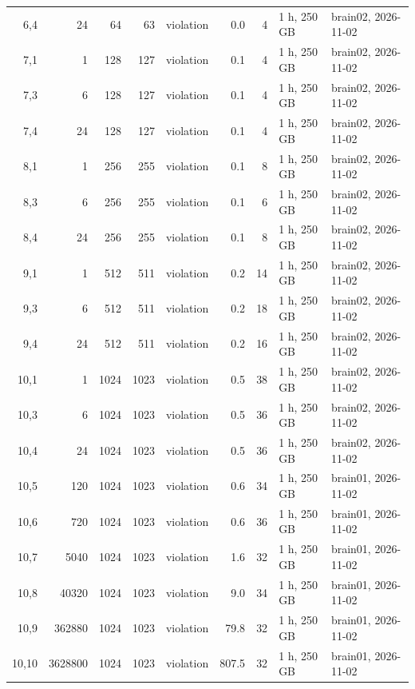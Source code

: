\documentclass[10pt]{article}
\begin{document}
\begin{longtable}{@{}rrrrlrrll@{}}
\color{blue} 6,4 & 24 & 64 & 63 & violation & 0.0 & 4 & 1 h, 250 GB & brain02, 2026-11-02 \\
\color{blue} 7,1 & 1 & 128 & 127 & violation & 0.1 & 4 & 1 h, 250 GB & brain02, 2026-11-02 \\
\color{blue} 7,3 & 6 & 128 & 127 & violation & 0.1 & 4 & 1 h, 250 GB & brain02, 2026-11-02 \\
\color{blue} 7,4 & 24 & 128 & 127 & violation & 0.1 & 4 & 1 h, 250 GB & brain02, 2026-11-02 \\
\color{blue} 8,1 & 1 & 256 & 255 & violation & 0.1 & 8 & 1 h, 250 GB & brain02, 2026-11-02 \\
\color{blue} 8,3 & 6 & 256 & 255 & violation & 0.1 & 6 & 1 h, 250 GB & brain02, 2026-11-02 \\
\color{blue} 8,4 & 24 & 256 & 255 & violation & 0.1 & 8 & 1 h, 250 GB & brain02, 2026-11-02 \\
\color{blue} 9,1 & 1 & 512 & 511 & violation & 0.2 & 14 & 1 h, 250 GB & brain02, 2026-11-02 \\
\color{blue} 9,3 & 6 & 512 & 511 & violation & 0.2 & 18 & 1 h, 250 GB & brain02, 2026-11-02 \\
\color{blue} 9,4 & 24 & 512 & 511 & violation & 0.2 & 16 & 1 h, 250 GB & brain02, 2026-11-02 \\
\color{blue} 10,1 & 1 & 1024 & 1023 & violation & 0.5 & 38 & 1 h, 250 GB & brain02, 2026-11-02 \\
\color{blue} 10,3 & 6 & 1024 & 1023 & violation & 0.5 & 36 & 1 h, 250 GB & brain02, 2026-11-02 \\
\color{blue} 10,4 & 24 & 1024 & 1023 & violation & 0.5 & 36 & 1 h, 250 GB & brain02, 2026-11-02 \\
\color{blue} 10,5 & 120 & 1024 & 1023 & violation & 0.6 & 34 & 1 h, 250 GB & brain01, 2026-11-02 \\
\color{blue} 10,6 & 720 & 1024 & 1023 & violation & 0.6 & 36 & 1 h, 250 GB & brain01, 2026-11-02 \\
\color{blue} 10,7 & 5040 & 1024 & 1023 & violation & 1.6 & 32 & 1 h, 250 GB & brain01, 2026-11-02 \\
\color{blue} 10,8 & 40320 & 1024 & 1023 & violation & 9.0 & 34 & 1 h, 250 GB & brain01, 2026-11-02 \\
\color{blue} 10,9 & 362880 & 1024 & 1023 & violation & 79.8 & 32 & 1 h, 250 GB & brain01, 2026-11-02 \\
\color{blue} 10,10 & 3628800 & 1024 & 1023 & violation & 807.5 & 32 & 1 h, 250 GB & brain01, 2026-11-02 \\
\bottomrule
\end{longtable}
\end{document}
